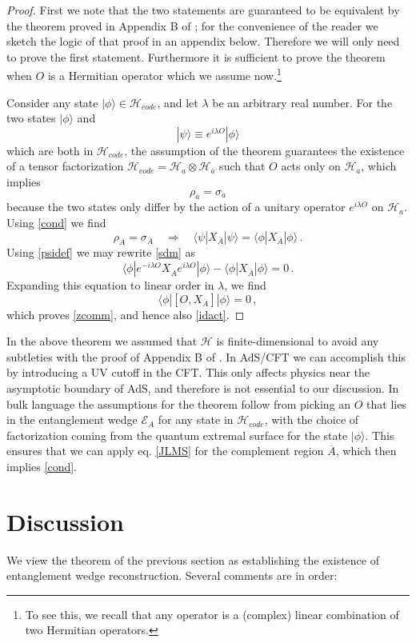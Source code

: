 \documentclass[aps,prl,twocolumn,nofootinbib,longbibliography,superscriptaddress]{revtex4-1}
\newcommand{\be}{\begin{equation}}
\newcommand{\ee}{\end{equation}}
\newcommand{\ran}{\rangle}
\newcommand{\EA}{\mathcal{E}_A}
\newcommand{\Ab}{\overline{A}}
\newcommand{\ab}{\overline{a}}
\newcommand{\Hc}{\mathcal{H}_{code}}
\newcommand{\Ha}{\mathcal{H}_a}
\newcommand{\Hab}{\mathcal{H}_{\overline{a}}}
\newcommand{\mH}{\mathcal{H}}
\def\l{\lambda}
\def\p{\phi}
\def\r{\rho}
\def\s{\sigma}
\def\y{\psi}
\def\la{\label}
\def\er{\eqref}
\def\eq{\equiv}
\def\qu{\quad}
\def\<{\langle}
\def\>{\rangle}
\begin{document}
\begin{proof}
First we note that the two statements are guaranteed to be equivalent by the theorem proved in Appendix B of \cite{Almheiri:2014lwa}; for the convenience of the reader we sketch the logic of that proof in an appendix below.  Therefore we will only need to prove the first statement.  Furthermore it is sufficient to prove the theorem when $O$ is a Hermitian operator which we assume now.\footnote{To see this, we recall that any operator is a (complex) linear combination of two Hermitian operators.}

Consider any state $|\p\> \in \Hc$, and let $\l$ be an arbitrary real number.  For the two states $|\p\> $ and
\be\la{psidef}
|\y\> \eq e^{i\l O} |\p\>
\ee
which are both in $\Hc$, the assumption of the theorem guarantees the existence of a tensor factorization $\Hc = \Ha \otimes \Hab$ such that $O$ acts only on $\Ha$, which implies
\be
\r_{\ab} = \s_{\ab}
\ee
because the two states only differ by the action of a unitary operator $e^{i\l O}$ on $\Ha$.  Using \er{cond} we find
\be\la{sdm}
\r_{\Ab} = \s_{\Ab} \qu\Rightarrow\qu \<\y |X_{\Ab}| \y\> = \<\p |X_{\Ab}| \p\> \,.
\ee
Using \er{psidef} we may rewrite \er{sdm} as
\be
\<\p | e^{-i\l O} X_{\Ab} e^{i\l O} | \p\> - \<\p |X_{\Ab}| \p\> =0 \,.
\ee
Expanding this equation to linear order in $\l$, we find
\be
\<\p | [O, X_{\Ab}] | \p\> =0 \,,
\ee
which proves \er{zcomm}, and hence also \er{idact}.
\end{proof}

In the above theorem we assumed that $\mH$ is finite-dimensional to avoid any subtleties with the proof of Appendix B of \cite{Almheiri:2014lwa}.  In AdS/CFT we can accomplish this by introducing a UV cutoff in the CFT. This only affects physics near the asymptotic boundary of AdS, and therefore is not essential to our discussion.  In bulk language the assumptions for the theorem follow from picking an $O$ that lies in the entanglement wedge $\EA$ for any state in $\Hc$, with the choice of factorization coming from the quantum extremal surface for the state $|\phi\ran$.  This ensures that we can apply eq. \eqref{JLMS} for the complement region $\Ab$, which then implies \eqref{cond}.


\section{Discussion}
We view the theorem of the previous section as establishing the existence of entanglement wedge reconstruction.  Several comments are in order:
\end{document}
